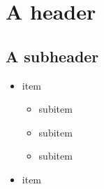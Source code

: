 \documentclass[a4paper]{article}
\begin{document}
    \tableofcontents
    \clearpage
    
    \section{A header}

    \subsection{A subheader}

    \begin{itemize}
        \item item
        \begin{itemize}
            \item subitem
            \item subitem
            \item subitem
        \end{itemize}
        \item item
    \end{itemize}


    \clearpage
    
    
    \clearpage
    \printglossaries
\end{document}
